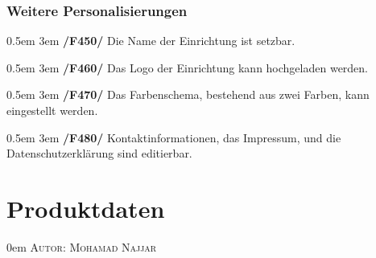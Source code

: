 \documentclass{article}
\makeatletter
\newcommand{\sectionauthor}[1]{
	{\parindent 0em \large \scshape Autor: #1 \par \nobreak \vspace*{2em}}
	\@afterheading
}
\newcommand{\specification}[3]{
	{\parindent 0.5em \hangindent 3em \hypertarget{spec:#1:#2}{\textbf{/#1#2/}} #3 \par \nobreak \vspace*{0.5em}}
}
\makeatother
\begin{document}
	\subsubsection{Weitere Personalisierungen}
		\specification{F}{450}{Die Name der Einrichtung ist setzbar. }
		\specification{F}{460}{Das Logo der Einrichtung kann hochgeladen werden. }
		\specification{F}{470}{Das Farbenschema, bestehend aus zwei Farben, kann eingestellt werden. }
		\specification{F}{480}{Kontaktinformationen, das Impressum, und die Datenschutzerklärung sind editierbar. }

\section{Produktdaten} %
\sectionauthor{Mohamad Najjar}
\end{document}
